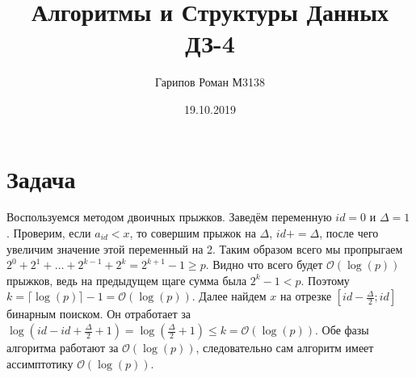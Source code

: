 \documentclass{article}
\title{Алгоритмы и Структуры Данных ДЗ-4}
\date{19.10.2019}
\author{Гарипов Роман М3138}
\begin{document}
  \maketitle
  \newpage


\section*{Задача }
Воспользуемся методом двоичных прыжков. Заведём переменную $id = 0$ и $\Delta = 1$ . Проверим, если $a_{id} < x$, то совершим прыжок на $\Delta$, $id += \Delta$, после чего увеличим значение этой переменный на 2. Таким образом всего мы пропрыгаем $2^{0} + 2^{1} + \dots + 2^{k - 1} + 2^{k} = 2^{k + 1} - 1 \geq p$. Видно что всего будет $\mathcal{O}(\log(p))$ прыжков, ведь на предыдущем щаге сумма была $2^{k} - 1 < p$. Поэтому $k = \lceil \log(p) \rceil - 1 = \mathcal{O}(\log(p))$. Далее найдем $x$ на отрезке $[id - \frac{\Delta}{2}; id]$ бинарным поиском. Он отработает за $\log(id - id + \frac{\Delta}{2} + 1) = \log(\frac{\Delta}{2} + 1) \leq k = \mathcal{O}(\log(p))$. Обе фазы алгоритма работают за $\mathcal{O}(\log(p))$, следовательно сам алгоритм имеет ассимптотику $\mathcal{O}(\log(p))$.
\end{document}
